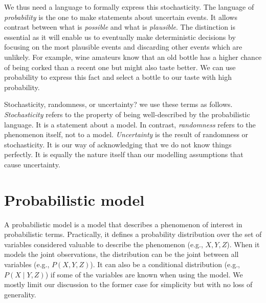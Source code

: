 We thus need a language to formally express this stochasticity. The language of \textit{probability} is the one to make statements about uncertain events. It allows contrast between what is \textit{possible} and what is \textit{plausible}. The distinction is essential as it will enable us to eventually make deterministic decisions by focusing on the most plausible events and discarding other events which are unlikely. For example, wine amateurs know that an old bottle has a higher chance of being corked than a recent one but might also taste better. We can use probability to express this fact and select a bottle to our taste with high probability.

\begin{side_note}{Stochasticity, randomness, or uncertainty?}
we use these terms as follows. \textit{Stochasticity} refers to the property of being well-described by the probabilistic language. It is a statement about a model. In contrast, \textit{randomness} refers to the phenomenon itself, not to a model. \textit{Uncertainty} is the result of randomness or stochasticity. It is our way of acknowledging that we do not know things perfectly. It is equally the nature itself than our modelling assumptions that cause uncertainty.
\end{side_note}

\section{Probabilistic model}
A probabilistic model is a model that describes a phenomenon of interest in probabilistic terms. Practically, it defines a probability distribution over the set of variables considered valuable to describe the phenomenon (e.g., $X, Y, Z$). When it models the joint observations, the distribution can be the joint between all variables (e.g., $P(X, Y, Z)$). It can also be a conditional distribution  (e.g., $P(X \mid Y, Z)$) if some of the variables are known when using the model. We mostly limit our discussion to the former case for simplicity but with no loss of generality.

